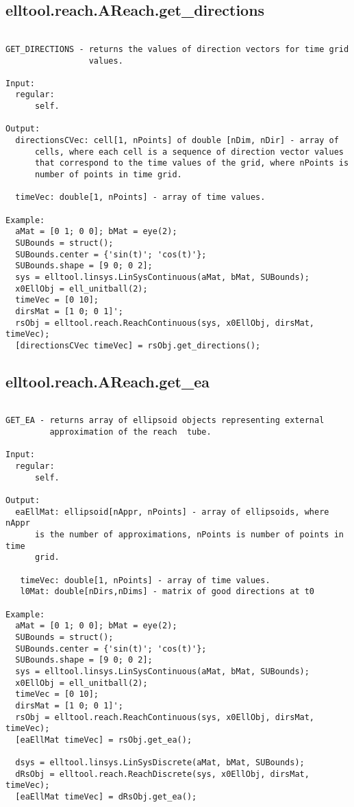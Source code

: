 \subsection{\texorpdfstring{elltool.reach.AReach.get\_directions}{get\_directions}}\label{method:elltool.reach.AReach.getdirections}
\begin{verbatim}

GET_DIRECTIONS - returns the values of direction vectors for time grid
                 values.

Input:
  regular:
      self.

Output:
  directionsCVec: cell[1, nPoints] of double [nDim, nDir] - array of
      cells, where each cell is a sequence of direction vector values
      that correspond to the time values of the grid, where nPoints is
      number of points in time grid.

  timeVec: double[1, nPoints] - array of time values.

Example:
  aMat = [0 1; 0 0]; bMat = eye(2);
  SUBounds = struct();
  SUBounds.center = {'sin(t)'; 'cos(t)'};
  SUBounds.shape = [9 0; 0 2];
  sys = elltool.linsys.LinSysContinuous(aMat, bMat, SUBounds);
  x0EllObj = ell_unitball(2);
  timeVec = [0 10];
  dirsMat = [1 0; 0 1]';
  rsObj = elltool.reach.ReachContinuous(sys, x0EllObj, dirsMat, timeVec);
  [directionsCVec timeVec] = rsObj.get_directions();
\end{verbatim}
\subsection{\texorpdfstring{elltool.reach.AReach.get\_ea}{get\_ea}}\label{method:elltool.reach.AReach.getea}
\begin{verbatim}

GET_EA - returns array of ellipsoid objects representing external
         approximation of the reach  tube.

Input:
  regular:
      self.

Output:
  eaEllMat: ellipsoid[nAppr, nPoints] - array of ellipsoids, where nAppr
      is the number of approximations, nPoints is number of points in time
      grid.

   timeVec: double[1, nPoints] - array of time values.
   l0Mat: double[nDirs,nDims] - matrix of good directions at t0

Example:
  aMat = [0 1; 0 0]; bMat = eye(2);
  SUBounds = struct();
  SUBounds.center = {'sin(t)'; 'cos(t)'};
  SUBounds.shape = [9 0; 0 2];
  sys = elltool.linsys.LinSysContinuous(aMat, bMat, SUBounds);
  x0EllObj = ell_unitball(2);
  timeVec = [0 10];
  dirsMat = [1 0; 0 1]';
  rsObj = elltool.reach.ReachContinuous(sys, x0EllObj, dirsMat, timeVec);
  [eaEllMat timeVec] = rsObj.get_ea();

  dsys = elltool.linsys.LinSysDiscrete(aMat, bMat, SUBounds);
  dRsObj = elltool.reach.ReachDiscrete(sys, x0EllObj, dirsMat, timeVec);
  [eaEllMat timeVec] = dRsObj.get_ea();
\end{verbatim}
